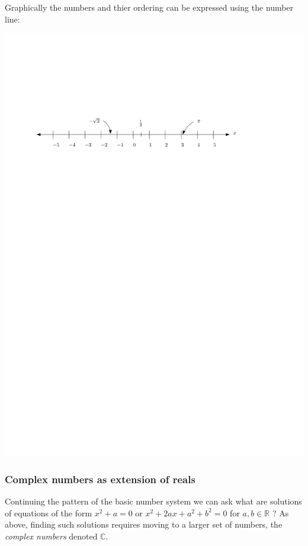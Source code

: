Graphically the numbers and thier ordering can be expressed using the number line:

\begin{center}
  \includegraphics[scale=1]{graphics/number-line.pdf}
\end{center}

\subsubsection*{Complex numbers as extension of reals}

Continuing the pattern of the basic number system we can ask what are solutions of equations of the form $x^2+a = 0$ or $x^2 + 2ax +a^2 + b^2 = 0$ for $a,b \in \mathbb{R}$ ? As above, finding such solutions requires moving to a larger set of numbers, the \emph{complex numbers} denoted $\mathbb{C}$.

